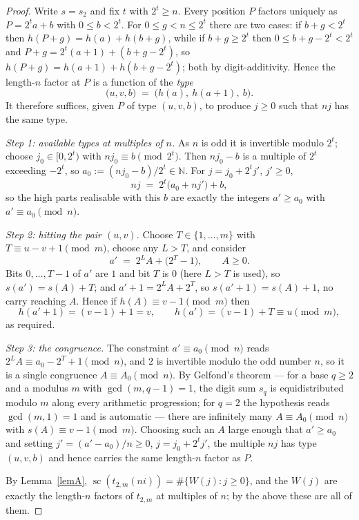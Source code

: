 \documentclass[10pt,reqno]{amsart}
\theoremstyle{plain}
\theoremstyle{definition}
\theoremstyle{remark}
\numberwithin{theorem}{section}
\DeclareMathOperator{\sco}{sc}
\newcommand{\N}{\mathbb{N}}
\newcommand{\tm}{t_{2,m}}
\begin{document}
\begin{proof}
Write $s = s_2$ and fix $t$ with $2^t \ge n$. Every position $P$ factors uniquely as
$P = 2^t a + b$ with $0 \le b < 2^t$. For $0 \le g < n \le 2^t$ there are two cases: if
$b + g < 2^t$ then $h(P+g) = h(a) + h(b+g)$, while if $b+g \ge 2^t$ then
$0 \le b+g-2^t < 2^t$ and $P + g = 2^t(a+1) + (b+g-2^t)$, so
$h(P+g) = h(a+1) + h(b+g-2^t)$; both by digit-additivity. Hence the length-$n$ factor at
$P$ is a function of the \emph{type}
\[
  \bigl(u,v,b\bigr) \;=\; \bigl(h(a),\ h(a+1),\ b\bigr) .
\]
It therefore suffices, given $P$ of type $(u,v,b)$, to produce $j \ge 0$ such that $nj$ has
the same type.

\emph{Step 1: available types at multiples of $n$.} As $n$ is odd it is invertible modulo
$2^t$; choose $j_0 \in [0,2^t)$ with $n j_0 \equiv b \pmod{2^t}$. Then $nj_0 - b$ is a
multiple of $2^t$ exceeding $-2^t$, so $a_0 := (nj_0 - b)/2^t \in \N$. For
$j = j_0 + 2^t j'$, $j' \ge 0$,
\[
  nj \;=\; 2^t\bigl(a_0 + n j'\bigr) + b ,
\]
so the high parts realisable with this $b$ are exactly the integers $a' \ge a_0$ with
$a' \equiv a_0 \pmod n$.

\emph{Step 2: hitting the pair $(u,v)$.} Choose $T \in \{1,\dots,m\}$ with
$T \equiv u - v + 1 \pmod m$, choose any $L > T$, and consider
\[
  a' \;=\; 2^L A + \bigl(2^T - 1\bigr), \qquad A \ge 0 .
\]
Bits $0,\dots,T-1$ of $a'$ are $1$ and bit $T$ is $0$ (here $L > T$ is used), so
$s(a') = s(A) + T$; and $a'+1 = 2^L A + 2^T$, so $s(a'+1) = s(A) + 1$, no carry reaching
$A$. Hence if $h(A) \equiv v - 1 \pmod m$ then
\[
  h(a'+1) = (v-1) + 1 = v, \qquad h(a') = (v-1) + T \equiv u \pmod m ,
\]
as required.

\emph{Step 3: the congruence.} The constraint $a' \equiv a_0 \pmod n$ reads
$2^L A \equiv a_0 - 2^T + 1 \pmod n$, and $2$ is invertible modulo the odd number $n$, so it
is a single congruence $A \equiv A_0 \pmod n$. By Gelfond's theorem \cite{Gelfond} --- for a
base $q \ge 2$ and a modulus $m$ with $\gcd(m,q-1) = 1$, the digit sum $s_q$ is
equidistributed modulo $m$ along every arithmetic progression; for $q = 2$ the hypothesis
reads $\gcd(m,1) = 1$ and is automatic --- there are infinitely many $A \equiv A_0
\pmod n$ with $s(A) \equiv v-1 \pmod m$. Choosing such an $A$ large enough that
$a' \ge a_0$ and setting $j' = (a' - a_0)/n \ge 0$, $j = j_0 + 2^t j'$, the multiple $nj$
has type $(u,v,b)$ and hence carries the same length-$n$ factor as $P$.

By Lemma~\ref{lemA}, $\sco(\tm(ni)) = \#\{W(j) : j \ge 0\}$, and the $W(j)$ are exactly the
length-$n$ factors of $\tm$ at multiples of $n$; by the above these are all of them.
\end{proof}
\end{document}
